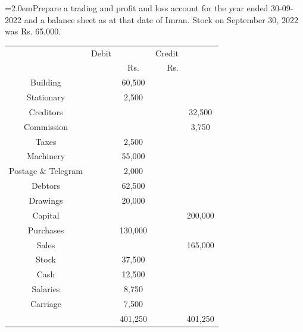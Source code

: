 \documentclass[11pt,a4paper]{article}
\newcommand{\lqn}[2]{\Needspace{6\baselineskip}\par\medskip\noindent\hangindent=2.0em\hangafter=1\makebox[2.0em][l]{\textbf{#1.}}#2\par}
\begin{document}
\lqn{89}{Prepare a trading and profit and loss account for the year ended 30-09-2022 and a balance sheet as at that date of Imran. Stock on September 30, 2022 was Rs. 65,000.\par
\par\smallskip\noindent\hspace*{1.2em}\begin{tabular}{|cccrc|}
\hline
 & Debit &  & Credit &  \\
 &  & Rs. & Rs. &  \\
Building &  & 60,500 &  &  \\
Stationary &  & 2,500 &  &  \\
Creditors &  &  &  & 32,500 \\
Commission &  &  &  & 3,750 \\
Taxes &  & 2,500 &  &  \\
Machinery &  & 55,000 &  &  \\
Postage \& Telegram &  & 2,000 &  &  \\
Debtors &  & 62,500 &  &  \\
Drawings &  & 20,000 &  &  \\
Capital &  &  &  & 200,000 \\
Purchases &  & 130,000 &  &  \\
Sales &  &  &  & 165,000 \\
Stock &  & 37,500 &  &  \\
Cash &  & 12,500 &  &  \\
Salaries &  & 8,750 &  &  \\
Carriage &  & 7,500 &  &  \\
 &  & 401,250 &  & 401,250 \\
\hline
\end{tabular}\par\smallskip
}
\end{document}
